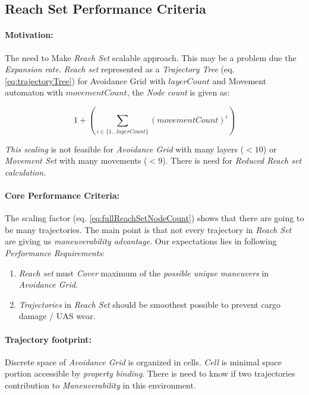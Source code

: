 \subsection{Reach Set Performance Criteria}\label{s:ReachSetPerformanceCriteria}

\paragraph{Motivation:} The need to Make \emph{Reach Set} scalable approach. This may be a problem due the \emph{Expansion rate}. \emph{Reach set} represented as a \emph{Trajectory Tree} (eq. \ref{eq:trajectoryTree}) for Avoidance Grid with $layerCount$ and Movement automaton with $movementCount$, the \emph{Node count} is given as:

\begin{equation}\label{eq:fullReachSetNodeCount}
    1+ \left(\sum_{i\in\{1\dots layerCount\}} (movementCount)^i\right)
\end{equation}

\emph{This scaling} is not feasible for \emph{Avoidance Grid} with many layers ($< 10$) or \emph{Movement Set} with many movements ($< 9$). There is need for \emph{Reduced Reach set calculation}.

\paragraph{Core Performance Criteria:} The scaling factor (eq. \ref{eq:fullReachSetNodeCount}) shows that there are going to be many trajectories. The main point is that not every trajectory in \emph{Reach Set} are giving us \emph{maneuverability advantage}. Our expectations lies in following \emph{Performance Requirements}:

\begin{enumerate}
    \item \emph{Reach set} must \emph{Cover} maximum of the \emph{possible unique maneuvers} in  \emph{Avoidance Grid}.
    \item \emph{Trajectories} in \emph{Reach Set} should be smoothest possible to prevent cargo damage / UAS wear.
\end{enumerate}

\paragraph{Trajectory footprint:} Discrete space of \emph{Avoidance Grid} is organized in cells. \emph{Cell} is minimal space portion accessible by \emph{property binding}. There is need to know if two trajectories contribution to \emph{Maneuverability} in this environment. 

